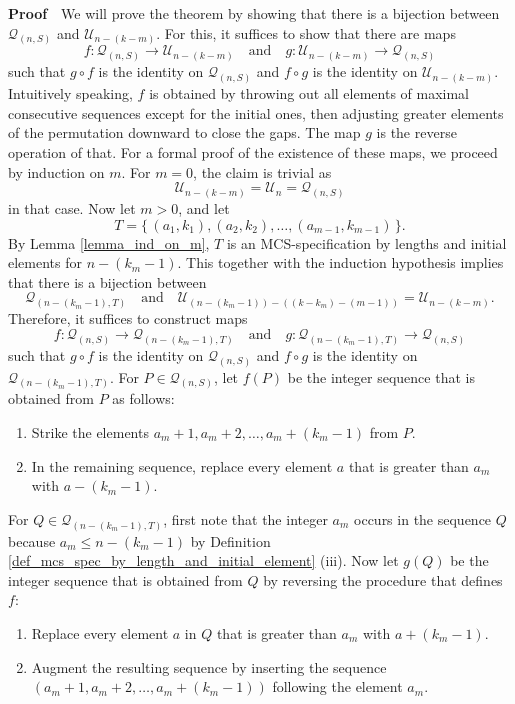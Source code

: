 \documentclass{article}
\def\proof{\par \noindent              %
\mbox{\bf Proof}\ \,}                  %
\begin{document}
\proof
We will prove the theorem by showing that there is a bijection between ${\mathcal Q}_{(n,S)}$
and ${\mathcal U}_{n - (k - m)}$. For this, it suffices to show that there are maps
$$
f: {\mathcal Q}_{(n,S)}\rightarrow {\mathcal U}_{n - (k - m)}
\quad\text{and}\quad 
g: {\mathcal U}_{n - (k - m)} \rightarrow {\mathcal Q}_{(n,S)}
$$
such that $g\circ f$ is the identity on ${\mathcal Q}_{(n,S)}$ and $f\circ g$ is the identity on
${\mathcal U}_{n - (k - m)}$. Intuitively speaking, $f$ is obtained by throwing out
all elements of maximal consecutive sequences except for the initial ones, then adjusting greater
elements of the permutation downward to close the gaps. The map $g$ is the reverse operation of that.
For a formal proof of the existence of these maps, we proceed by induction on $m$. For $m=0$,
the claim is trivial as $${\mathcal U}_{n - (k - m)} = {\mathcal U}_n = {\mathcal Q}_{(n,S)}$$
in that case. Now let $m>0$, and let
$$
T = \{\,(a_1, k_1), (a_2, k_2), \ldots,(a_{m-1}, k_{m-1})\,\}.
$$
By Lemma \ref{lemma_ind_on_m}, $T$ is an MCS-specification by lengths and initial elements
for $n - (k_m - 1)$. This together with the induction hypothesis implies
that there is a bijection between
$$
{\mathcal Q}_{(n-(k_m-1),T)}
\quad\text{and}\quad
{\mathcal U}_{(n-(k_m-1)) - ((k-k_m) - (m-1))} = {\mathcal U}_{n - (k - m)}.
$$
Therefore, it suffices to construct maps
$$
f: {\mathcal Q}_{(n,S)}\rightarrow {\mathcal Q}_{(n-(k_m-1),T)}
\quad\text{and}\quad 
g: {\mathcal Q}_{(n-(k_m-1),T)} \rightarrow {\mathcal Q}_{(n,S)}
$$
such that $g\circ f$ is the identity on ${\mathcal Q}_{(n,S)}$ and $f\circ g$ is the identity on
${\mathcal Q}_{(n-(k_m-1),T)}$.
For $P\in {\mathcal Q}_{(n,S)}$, let $f(P)$ be the integer sequence that is obtained from $P$ as follows:
\begin{enumerate}
\item
  Strike the elements $a_m + 1, a_m+2, \ldots, a_m+(k_m-1)$ from $P$.
\item
  In the remaining sequence, replace every element $a$ that is greater than $a_m$ with $a-(k_m-1)$.
\end{enumerate}
For $Q\in {\mathcal Q}_{(n-(k_m-1),T)}$, first note that the integer $a_m$ occurs in the sequence $Q$
because $a_m \leq n-(k_m-1)$ by Definition \ref{def_mcs_spec_by_length_and_initial_element} (iii).
Now let $g(Q)$ be the integer sequence that
is obtained from $Q$ by reversing the procedure that defines $f$:
\begin{enumerate}
\item
 Replace every element $a$ in $Q$ that is greater than $a_m$ with $a+(k_m-1)$.
\item
  Augment the resulting sequence by inserting the sequence $(a_m + 1, a_m+2, \ldots, a_m+(k_m-1))$
  following the element $a_m$.
\end{enumerate}
\end{document}
